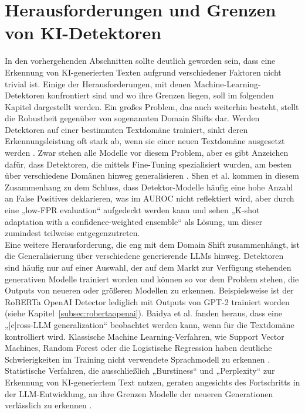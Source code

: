 \section{Herausforderungen und Grenzen von KI-Detektoren}
\label{sec:herausforderungen_grenzen}
In den vorhergehenden Abschnitten sollte deutlich geworden sein, dass eine Erkennung von KI-generierten Texten aufgrund verschiedener Faktoren nicht trivial ist. Einige der Herausforderungen, mit denen Machine-Learning-Detektoren konfrontiert sind und wo ihre Grenzen liegen, soll im folgenden Kapitel dargestellt werden.
Ein großes Problem, das auch weiterhin besteht, stellt die Robustheit gegenüber von sogenannten Domain Shifts dar. Werden Detektoren auf einer bestimmten Textdomäne trainiert, sinkt deren Erkennungsleistung oft stark ab, wenn sie einer neuen Textdomäne ausgesetzt werden \autocite{pudasaini2026aigeneratedtextdetectionfails}. Zwar stehen alle Modelle vor diesem Problem, aber es gibt Anzeichen dafür, dass Detektoren, die mittels Fine-Tuning spezialisiert wurden, am besten über verschiedene Domänen hinweg generalisieren \autocite{baidya2026detectingmachinecomprehensivebenchmark}. Shen et al. \autocite{shen2026rethinkingaigeneratedtextdetection} kommen in diesem Zusammenhang zu dem Schluss, dass Detektor-Modelle häufig eine hohe Anzahl an False Positives deklarieren, was im AUROC nicht reflektiert wird, aber durch eine „low-FPR evaluation“ aufgedeckt werden kann und sehen „K-shot adaptation with a confidence-weighted ensemble“ als Lösung, um dieser zumindest teilweise entgegenzutreten. \\
Eine weitere Herausforderung, die eng mit dem Domain Shift zusammenhängt, ist die Generalisierung über verschiedene generierende LLMs hinweg. Detektoren sind häufig nur auf einer Auswahl, der auf dem Markt zur Verfügung stehenden generativen Modelle trainiert worden und können so vor dem Problem stehen, die Outputs von neueren oder größeren Modellen zu erkennen. Beispielsweise ist der RoBERTa OpenAI Detector lediglich mit Outputs von GPT-2 trainiert worden (siehe Kapitel~\ref{subsec:robertaopenai}). Baidya et al. \autocite{baidya2026detectingmachinecomprehensivebenchmark} fanden heraus, dass eine „[c]ross-LLM generalization“ beobachtet werden kann, wenn für die Textdomäne kontrolliert wird. Klassische Machine Learning-Verfahren, wie Support Vector Machines, Random Forest oder die Logistische Regression haben deutliche Schwierigkeiten im Training nicht verwendete Sprachmodell zu erkennen \autocite{pudasaini2026aigeneratedtextdetectionfails}. Statistische Verfahren, die ausschließlich „Burstiness“ und „Perplexity“ zur Erkennung von KI-generiertem Text nutzen, geraten angesichts des Fortschritts in der LLM-Entwicklung, an ihre Grenzen Modelle der neueren Generationen verlässlich zu erkennen \autocite{chakraborty2023counterturingtestct2}. \\
